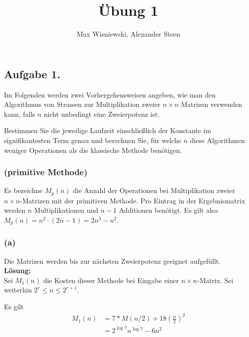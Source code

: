 \documentclass[11pt,a4paper,ngerman]{article}
\date{}
\title{Übung 1}
\author{Max Wisniewski, Alexander Steen}
\begin{document}

\renewcommand{\figurename}{Figure}

\maketitle
\thispagestyle{fancy}

\subsection*{Aufgabe 1.}

Im Folgenden werden zwei Vorhergehensweisen angeben, wie man den Algorithmus
von Strassen zur Multiplikation zweier $n \times n$ Matrizen verwenden kann, falls
$n$ nicht unbedingt eine Zweierpotenz ist.

Bestimmen Sie die jeweilige Laufzeit einschließlich der Konstante im signifikantesten
Term genau und berechnen Sie, für welche $n$ diese Algorithmen weniger Operationen als
die klassische Methode benötigen.

\subsubsection*{(primitive Methode)}
Es bezeichne $M_p(n)$ die Anzahl der Operationen bei Multiplikation zweier $n \times n$-Matrizen
mit der primitiven Methode. Pro Eintrag in der Ergebnismatrix werden $n$ Multiplikationen
und $n-1$ Additionen benötigt. Es gilt also $M_p(n) = n^2 \cdot (2n-1) = 2n^3-n^2$.

\subsubsection*{(a)}

Die Matrizen werden bis zur nächsten Zweierpotenz geeignet aufgefüllt.\\

\textbf{Lösung:}\\
Sei $M_1(n)$ die Kosten dieser Methode bei Eingabe einer $n \times n$-Matrix.
Sei weiterhin $2^r \leq n \leq 2^{r+1}$.
 

Es gilt
\begin{equation*}\begin{split}
M_1(n) &= 7*M(n/2) + 18 \left(\frac{n}{2}\right)^2 \\
       & = 2^{\log 7} n^{\log 7} - 6n^2
\end{split}\end{equation*}
\end{document}

